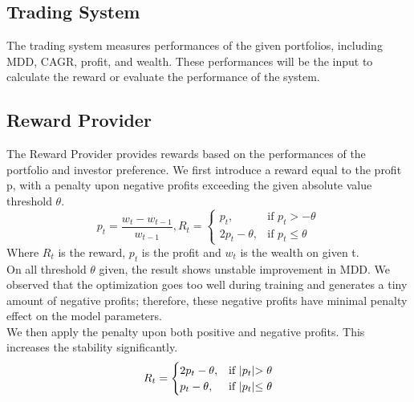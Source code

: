 \subsection {Trading System}
The trading system measures performances of the given portfolios, including MDD, CAGR, profit, and wealth. These performances will be the input to calculate the reward or evaluate the performance of the system. 
\subsection {Reward Provider}
The Reward Provider provides rewards based on the performances of the portfolio and investor preference. We first introduce a reward equal to the profit p, with a penalty upon negative profits exceeding the given absolute value threshold \(\theta\). 
\[
p_t = \frac{w_t-w_{t-1}}{w_{t-1}}
, 
R_t = 
\begin{cases}
    p_t,&\text{if  }p_t > -\theta\\
    2p_t - \theta ,&\text{if  }p_t \leq  \theta
\end{cases}
\]
Where \(R_t\) is the reward, \(p_t\) is the profit and \(w_t\) is the wealth on given t.
\\
On all threshold \(\theta\) given, the result shows unstable improvement in MDD. We observed that the optimization goes too well during training and generates a tiny amount of negative profits; therefore, these negative profits have minimal penalty effect on the model parameters.
\\
We then apply the penalty upon both positive and negative profits. This increases the stability significantly.
\[
R_t = 
\begin{cases}
    2p_t - \theta,&\text{if  }    $$|p_t|$$ > \theta\\
    p_t - \theta ,&\text{if  } $$|p_t|$$\leq  \theta
\end{cases}
\]

